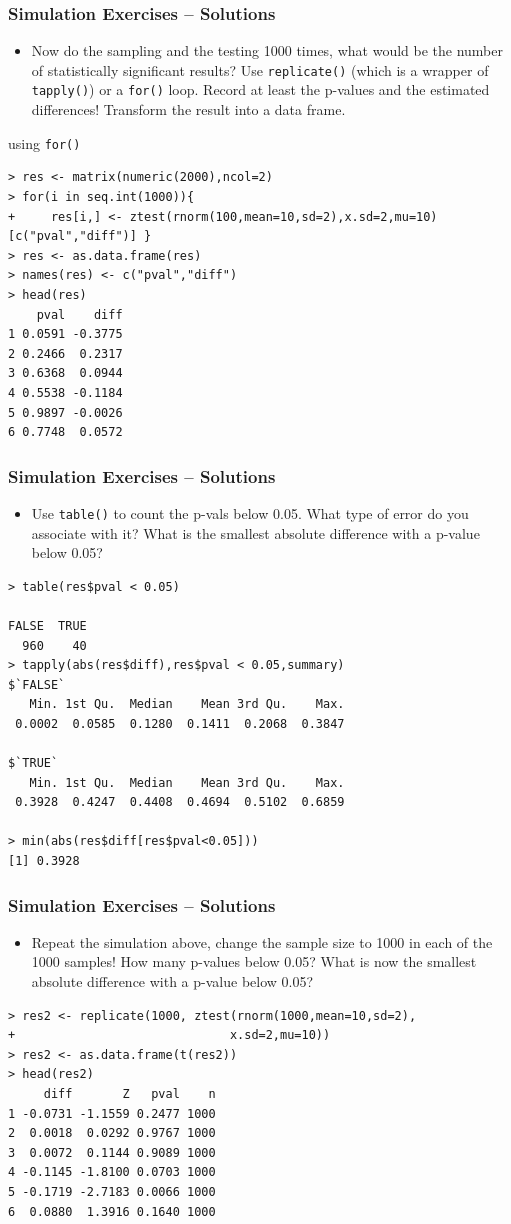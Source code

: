 \documentclass[xcolor={table}]{beamer}
\begin{document}
\begin{frame}[fragile]\frametitle{Simulation Exercises -- Solutions} 
  \begin{itemize}
  \item Now do the sampling and the testing 1000 times, what would be the number of statistically significant results? Use \texttt{replicate()} (which is a wrapper of \texttt{tapply()}) or a \texttt{for()} loop. Record at least the p-values and the estimated differences! Transform the result into a data frame.
  \end{itemize}
using \texttt{for()} \scriptsize
\begin{verbatim}
> res <- matrix(numeric(2000),ncol=2)
> for(i in seq.int(1000)){
+     res[i,] <- ztest(rnorm(100,mean=10,sd=2),x.sd=2,mu=10)[c("pval","diff")] }
> res <- as.data.frame(res)
> names(res) <- c("pval","diff")
> head(res)
    pval    diff
1 0.0591 -0.3775
2 0.2466  0.2317
3 0.6368  0.0944
4 0.5538 -0.1184
5 0.9897 -0.0026
6 0.7748  0.0572
\end{verbatim}
\end{frame}

\begin{frame}[fragile]\frametitle{Simulation Exercises -- Solutions} 
\begin{itemize}
\item Use \texttt{table()} to count the p-vals below 0.05. What type of error do you associate with it? What is the smallest absolute difference with a p-value below 0.05?
\end{itemize}\footnotesize
\begin{verbatim}
> table(res$pval < 0.05)

FALSE  TRUE 
  960    40 
> tapply(abs(res$diff),res$pval < 0.05,summary)
$`FALSE`
   Min. 1st Qu.  Median    Mean 3rd Qu.    Max. 
 0.0002  0.0585  0.1280  0.1411  0.2068  0.3847 

$`TRUE`
   Min. 1st Qu.  Median    Mean 3rd Qu.    Max. 
 0.3928  0.4247  0.4408  0.4694  0.5102  0.6859 

> min(abs(res$diff[res$pval<0.05]))
[1] 0.3928
\end{verbatim}
\end{frame}

\begin{frame}[fragile]\frametitle{Simulation Exercises -- Solutions} 
\begin{itemize}
\item Repeat the simulation above, change the sample size to 1000 in each of the 1000 samples! How many p-values below 0.05? What is now the smallest absolute difference with a p-value below 0.05?
\end{itemize}\small
\begin{verbatim}
> res2 <- replicate(1000, ztest(rnorm(1000,mean=10,sd=2),
+                              x.sd=2,mu=10))
> res2 <- as.data.frame(t(res2))
> head(res2)
     diff       Z   pval    n
1 -0.0731 -1.1559 0.2477 1000
2  0.0018  0.0292 0.9767 1000
3  0.0072  0.1144 0.9089 1000
4 -0.1145 -1.8100 0.0703 1000
5 -0.1719 -2.7183 0.0066 1000
6  0.0880  1.3916 0.1640 1000
\end{verbatim}
\end{frame}
\end{document}
